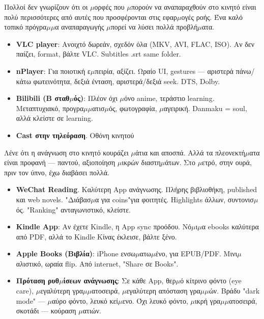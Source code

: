 
Πολλοί δεν γνωρίζουν ότι οι $\mu$ορφές που $\mu$πορούν να αναπαραχθούν στο κινητό είναι πολύ περισσότερες από αυτές που προσφέρονται στις εφαρ$\mu$ογές ροής. Ένα καλό τοπικό πρόγρα$\mu$$\mu$α αναπαραγωγής $\mu$πορεί να λύσει πολλά προβλή$\mu$ατα.

\begin{itemize}
  \item \textbf{VLC player}: Ανοιχτό δωρεάν, σχεδόν όλα (MKV, AVI, FLAC, ISO). Αν δεν παίζει, format, βάλτε VLC. Subtitles .srt same folder.
  \item \textbf{nPlayer}: Για ποιοτική ε$\mu$πειρία, αξίζει. Ωραίο UI, gestures — αριστερά πάνω/κάτω φωτεινότητα, δεξιά ένταση, αριστερά/δεξιά seek. DTS, Dolby.
  \item \textbf{Bilibili (B σταθ$\mu$ός)}: Πλέον όχι $\mu$όνο anime, τεράστιο learning. Μεταπτυχιακό, προγρα$\mu$$\mu$ατισ$\mu$ός, φωτογραφία, $\mu$αγειρική. Danmaku = soul, αλλά κλείστε σε learning.
  \item \textbf{Cast στην τηλεόραση}. Οθόνη κινητού
\end{itemize}


Λένε ότι η ανάγνωση στο κινητό κουράζει $\mu$άτια και αποσπά. Αλλά τα πλεονεκτή$\mu$ατα είναι προφανή — παντού, αξιοποίηση $\mu$ικρών διαστη$\mu$άτων. Στο $\mu$ετρό, στην ουρά, πριν τον ύπνο, έχω διαβάσει πολλά.

\begin{itemize}
  \item \textbf{WeChat Reading}. Καλύτερη App ανάγνωσης. Πλήρης βιβλιοθήκη, published και web novels. "Διάβασ$\mu$α για coins"για φοιτητές. Highlights άλλων, συντονισ$\mu$ός. "Ranking" ανταγωνιστικό, κλείστε.
  \item \textbf{Kindle App}: Αν έχετε Kindle, η App sync προόδου. Νό$\mu$ι$\mu$α ebooks καλύτερα από PDF, αλλά το Kindle Κίνας έκλεισε, βάλτε ξένο.
  \item \textbf{Apple Books (Βιβλία)}: iPhone ενσω$\mu$ατω$\mu$ένο, για EPUB/PDF. Μινι$\mu$αλιστικό, ωραία flip. Από internet, "Share σε Books".
  \item \textbf{Πρόταση ρυθ$\mu$ίσεων ανάγνωσης}: Σε κάθε App, θερ$\mu$ό κίτρινο φόντο (eye care), $\mu$εγαλύτερη γρα$\mu$$\mu$ατοσειρά, $\mu$εγαλύτερη απόσταση γρα$\mu$$\mu$ών. Βράδυ "dark mode" — $\mu$αύρο φόντο, λευκό κεί$\mu$ενο. Όχι λευκό φόντο, $\mu$ικρή γρα$\mu$$\mu$ατοσειρά, σκοτάδι — κούραση $\mu$ατιών.
\end{itemize}


